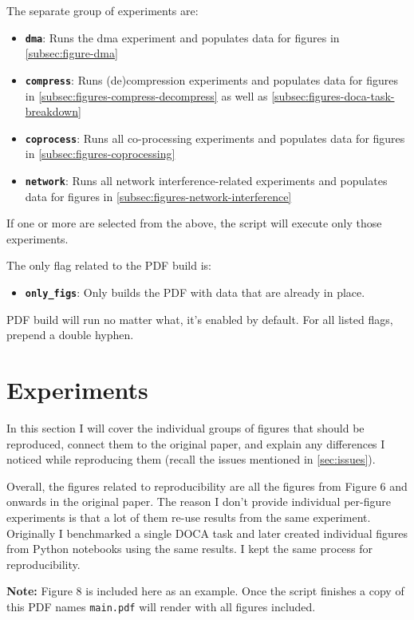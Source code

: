\documentclass[sigconf, nonacm]{acmart}
\begin{document}
The separate group of experiments are:
\begin{itemize}
    \item \textbf{\texttt{dma}}: Runs the dma experiment and populates data for figures in \cref{subsec:figure-dma}
    \item \textbf{\texttt{compress}}: Runs (de)compression experiments and populates data for figures in \cref{subsec:figures-compress-decompress} as well as \cref{subsec:figures-doca-task-breakdown}
    \item \textbf{\texttt{coprocess}}: Runs all co-processing experiments and populates data for figures in \cref{subsec:figures-coprocessing}
    \item \textbf{\texttt{network}}: Runs all network interference-related experiments and populates data for figures in \cref{subsec:figures-network-interference}
\end{itemize}

If one or more are selected from the above, the script will execute only those experiments.

The only flag related to the PDF build is:
\begin{itemize}
    \item \textbf{\texttt{only\_figs}}: Only builds the PDF with data that are already in place.
\end{itemize}

PDF build will run no matter what, it's enabled by default.
For all listed flags, prepend a double hyphen.

\section{Experiments}
In this section I will cover the individual groups of figures that should be reproduced,
connect them to the original paper, and explain any differences I noticed
while reproducing them (recall the issues mentioned in \cref{sec:issues}).

Overall, the figures related to reproducibility are all the figures from
Figure 6 and onwards in the original paper.
The reason I don't provide individual per-figure experiments is that a lot of them
re-use results from the same experiment. Originally I benchmarked a single DOCA task
and later created individual figures from Python notebooks using the same
results. I kept the same process for reproducibility.

\textbf{Note:} Figure 8 is included here as an example. Once the script finishes
a copy of this PDF names \texttt{main.pdf} will render with all figures included.
\end{document}
